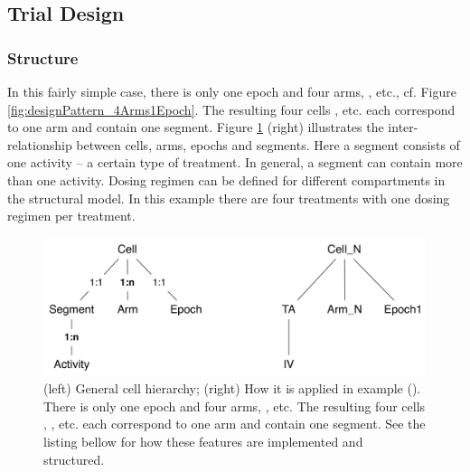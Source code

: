 \subsection{Trial Design}
\subsubsection{Structure}

In this fairly simple case, there is only one epoch and four arms, ,  etc.,
cf. Figure \ref{fig:designPattern_4Arms1Epoch}.
The resulting four cells ,  etc. each correspond
to one arm and contain one segment.
Figure \ref{fig:CellSegmentEpochArm_example1} (right) illustrates the inter-relationship between
cells, arms, epochs and segments. Here a segment consists of one activity --
a certain type of treatment. In general, a segment can contain more
than one activity. Dosing regimen can be defined for different
compartments in the structural model. In this example there are four
treatments with one dosing regimen per treatment.

\begin{figure}[htbp!]
\centering
\includegraphics[width=0.7\linewidth]{pics/CellSegmentEpochArm_example1.pdf}
\caption{(left) General cell hierarchy; (right) How it is applied in example ().
There is only one epoch and four arms, ,  etc.
The resulting four cells , , etc. each correspond
to one arm and contain one segment. See the listing bellow for how
these features are implemented and structured.}
\label{fig:CellSegmentEpochArm_example1}
\end{figure}

